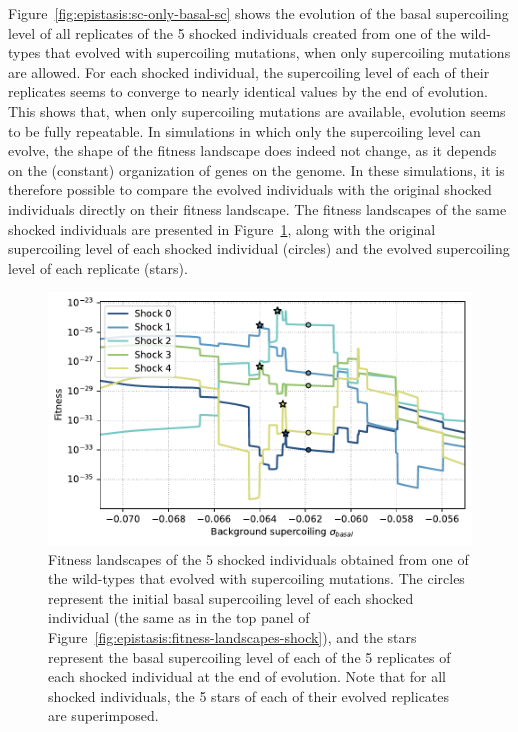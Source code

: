 Figure~\ref{fig:epistasis:sc-only-basal-sc} shows the evolution of the basal supercoiling level of all replicates of the 5 shocked individuals created from one of the wild-types that evolved with supercoiling mutations, when only supercoiling mutations are allowed.
For each shocked individual, the supercoiling level of each of their replicates seems to converge to nearly identical values by the end of evolution.
This shows that, when only supercoiling mutations are available, evolution seems to be fully repeatable.
In simulations in which only the supercoiling level can evolve, the shape of the fitness landscape does indeed not change, as it depends on the (constant) organization of genes on the genome.
In these simulations, it is therefore possible to compare the evolved individuals with the original shocked individuals directly on their fitness landscape.
The fitness landscapes of the same shocked individuals are presented in Figure~\ref{fig:epistasis:sc-only-fitness-landscape}, along with the original supercoiling level of each shocked individual (circles) and the evolved supercoiling level of each replicate (stars).

\begin{figure}
\centering
\includegraphics[width=\textwidth]{epistasis/img/with-sc/fitness_landscapes_wt_01_with_evolved.pdf}
\caption[Fitness landscapes with only supercoiling mutations]{Fitness landscapes of the 5 shocked individuals obtained from one of the wild-types that evolved with supercoiling mutations.
The circles represent the initial basal supercoiling level of each shocked individual (the same as in the top panel of Figure~\ref{fig:epistasis:fitness-landscapes-shock}), and the stars represent the basal supercoiling level of each of the 5 replicates of each shocked individual at the end of evolution.
Note that for all shocked individuals, the 5 stars of each of their evolved replicates are superimposed.}
\label{fig:epistasis:sc-only-fitness-landscape}
\end{figure}

